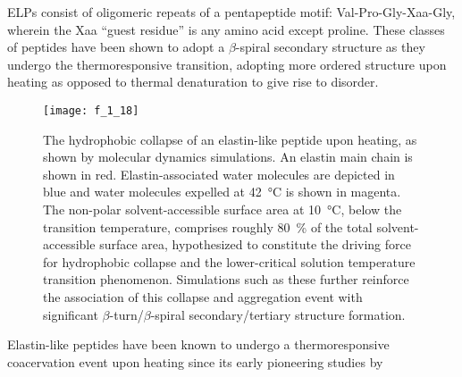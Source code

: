 \begin{refsection}
ELPs consist of oligomeric repeats of a pentapeptide motif:
Val-Pro-Gly-Xaa-Gly, wherein the Xaa ``guest residue'' is any amino acid except
proline. These classes of peptides have been shown to adopt a ${\beta}$-spiral
secondary structure as they undergo the thermoresponsive transition, adopting 
more ordered structure upon heating as opposed to thermal denaturation to give
rise to disorder.\cite{Urry1988,Urry1986,Urry1985}
\begin{figure}[h!] \centering \texttt{[image: f\_1\_18]}
    \caption[The hydrophobic
        collapse of an elastin-like peptide upon heating, as shown by molecular
        dynamics simulations. An elastin main chain is shown in red.
        Elastin-associated water molecules are depicted in blue and water
        molecules expelled at \SI{42}{\celsius} is shown in magenta. The
        non-polar solvent-accessible surface area at \SI{10}{\celsius}, below
        the transition temperature, comprises roughly \SI{80}{\percent} of the
        total solvent-accessible surface area, hypothesized to constitute the
        driving force for hydrophobic collapse and the lower-critical solution
        temperature transition phenomenon. Simulations such as these further
        reinforce the association of this collapse and aggregation event with
        significant ${\beta}$-turn/${\beta}$-spiral secondary/tertiary structure
        formation.]{The hydrophobic
        collapse of an elastin-like peptide upon heating, as shown by molecular
        dynamics simulations. An elastin main chain is shown in red.
        Elastin-associated water molecules are depicted in blue and water
        molecules expelled at \SI{42}{\celsius} is shown in magenta. The
        non-polar solvent-accessible surface area at \SI{10}{\celsius}, below
        the transition temperature, comprises roughly \SI{80}{\percent} of the
        total solvent-accessible surface area, hypothesized to constitute the
        driving force for hydrophobic collapse and the lower-critical solution
        temperature transition phenomenon. Simulations such as these further
        reinforce the association of this collapse and aggregation event with
        significant ${\beta}$-turn/${\beta}$-spiral secondary/tertiary structure
        formation.\cite{Li2001}}\label{fig:elastin_diagram}
    \end{figure}
Elastin-like peptides have been known to undergo a thermoresponsive coacervation
event upon heating since its early pioneering studies by

\end{refsection}
